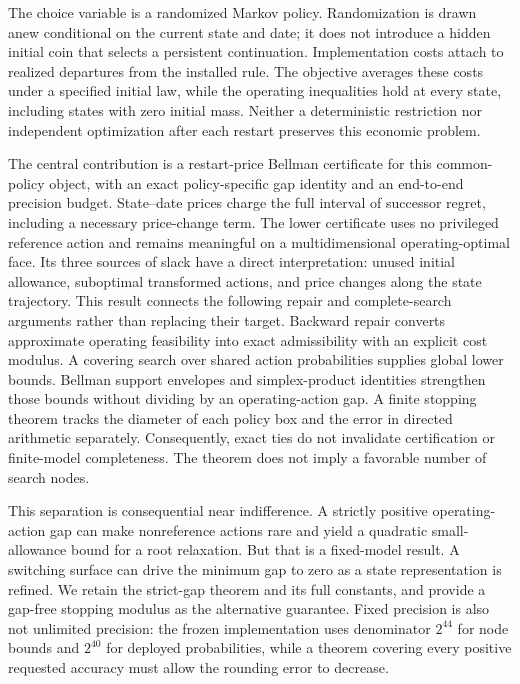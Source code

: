 The choice variable is a randomized Markov policy. Randomization is drawn anew conditional on the current state and date; it does not introduce a hidden initial coin that selects a persistent continuation. Implementation costs attach to realized departures from the installed rule. The objective averages these costs under a specified initial law, while the operating inequalities hold at every state, including states with zero initial mass. Neither a deterministic restriction nor independent optimization after each restart preserves this economic problem.

The central contribution is a restart-price Bellman certificate for this common-policy object, with an exact policy-specific gap identity and an end-to-end precision budget. State--date prices charge the full interval of successor regret, including a necessary price-change term. The lower certificate uses no privileged reference action and remains meaningful on a multidimensional operating-optimal face. Its three sources of slack have a direct interpretation: unused initial allowance, suboptimal transformed actions, and price changes along the state trajectory. This result connects the following repair and complete-search arguments rather than replacing their target. Backward repair converts approximate operating feasibility into exact admissibility with an explicit cost modulus. A covering search over shared action probabilities supplies global lower bounds. Bellman support envelopes and simplex-product identities strengthen those bounds without dividing by an operating-action gap. A finite stopping theorem tracks the diameter of each policy box and the error in directed arithmetic separately. Consequently, exact ties do not invalidate certification or finite-model completeness. The theorem does not imply a favorable number of search nodes.

This separation is consequential near indifference. A strictly positive operating-action gap can make nonreference actions rare and yield a quadratic small-allowance bound for a root relaxation. But that is a fixed-model result. A switching surface can drive the minimum gap to zero as a state representation is refined. We retain the strict-gap theorem and its full constants, and provide a gap-free stopping modulus as the alternative guarantee. Fixed precision is also not unlimited precision: the frozen implementation uses denominator $2^{44}$ for node bounds and $2^{40}$ for deployed probabilities, while a theorem covering every positive requested accuracy must allow the rounding error to decrease.

